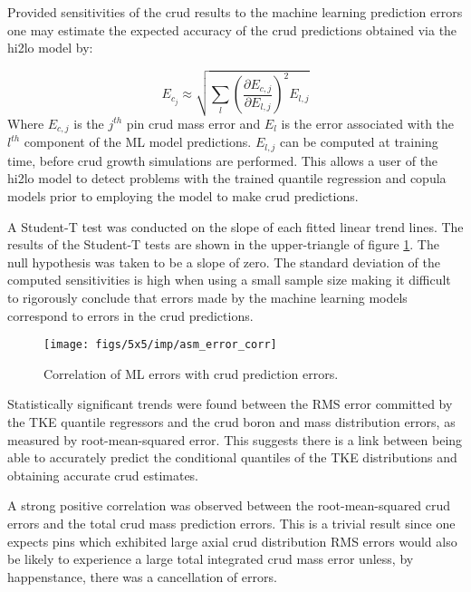 Provided sensitivities of the crud results to the machine learning prediction errors one may estimate the expected accuracy of the crud predictions obtained via the hi2lo model by:

\begin{equation} \nonumber
    E_{c_j} \approx \sqrt{ \sum_l \left( \frac{\partial E_{c,j}}{\partial E_{l,j}}\right)^2 E_{l,j} }
\end{equation}
Where $E_{c,j}$ is the $j^{th}$ pin crud mass error and $E_l$ is the error associated with the $l^{th}$ component of the ML model predictions.  $E_{l,j}$ can be computed at training time, before crud growth simulations are performed.
This allows a user of the hi2lo model to detect problems with the trained quantile regression and copula models prior to employing the model to make crud predictions.

A Student-T test was conducted on the slope of each fitted linear trend lines. The results of the Student-T tests are shown in the upper-triangle of figure \ref{fig:asmerrorcorr}.  The null hypothesis was taken to be a slope of zero.  The standard deviation of the computed sensitivities is high when using a small sample size making it difficult to rigorously conclude that errors made by the machine learning models correspond to errors in the crud predictions.

\begin{figure}[H]
    \centering
    \texttt{[image: figs/5x5/imp/asm\_error\_corr]}
    \caption{Correlation of ML errors with crud prediction errors.}
    \label{fig:asmerrorcorr}
\end{figure}

Statistically significant trends were found between the RMS error committed by the TKE quantile regressors and the crud boron and mass distribution errors, as measured by root-mean-squared error.  This suggests there is a link between being able to accurately predict the conditional quantiles of the TKE distributions and obtaining accurate crud estimates.

A strong positive correlation was observed between the root-mean-squared crud errors and the total crud mass prediction errors.  This is a trivial result since one expects pins which exhibited large axial crud distribution RMS errors would also be likely to experience a large total integrated crud mass error unless, by happenstance, there was a cancellation of errors.


